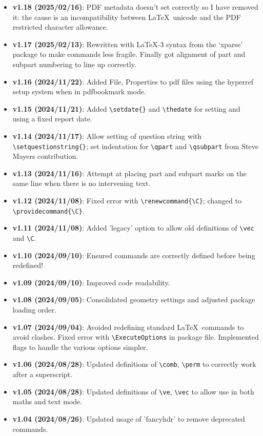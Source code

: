 \documentclass[a4paper,11pt,twoside]{article}
\begin{document}
\begin{itemize}
\item \textbf{v1.18 (2025/02/16)}: PDF metadata doesn't set correctly so I have removed it: the cause is an incompatibility between \LaTeX\ unicode and the PDF restricted character allowance.
\item \textbf{v1.17 (2025/02/13)}: Rewritten with \LaTeX-3 syntax from the `xparse' package to make commands less fragile. Finally got alignment of part and subpart numbering to line up correctly.
\item \textbf{v1.16 (2024/11/22)}: Added File, Properties to pdf files using the hyperref setup system when in pdfbookmark mode.
\item \textbf{v1.15 (2024/11/21)}: Added \verb|\setdate{}| and \verb|\thedate| for setting and using a fixed report date.
\item \textbf{v1.14 (2024/11/17)}: Allow setting of question string with \verb|\setquestionstring{}|; set indentation for \verb|\qpart| and \verb|\qsubpart| from Steve Mayers contribution.
\item \textbf{v1.13 (2024/11/16)}: Attempt at placing part and subpart marks on the same line when there is no intervening text.
\item \textbf{v1.12 (2024/11/08)}: Fixed error with \verb|\renewcommand{\C}|; changed to \\ \verb|\providecommand{\C}|.
\item \textbf{v1.11 (2024/11/08)}: Added 'legacy' option to allow old definitions of \verb|\vec| and \verb|\C|.
\item \textbf{v1.10 (2024/09/10)}: Ensured commands are correctly defined before being redefined!
\item \textbf{v1.09 (2024/09/10)}: Improved code readability.
\item \textbf{v1.08 (2024/09/05)}: Consolidated geometry settings and adjusted package loading order.
\item \textbf{v1.07 (2024/09/04)}: Avoided redefining standard \LaTeX\ commands to avoid clashes. Fixed error with \verb|\ExecuteOptions| in package file. Implemented flags to handle the various options simpler.
\item \textbf{v1.06 (2024/08/28)}: Updated definitions of \verb|\comb|, \verb|\perm| to correctly work after a superscript.
\item \textbf{v1.05 (2024/08/28)}: Updated definitions of \verb|\ve|, \verb|\vec| to allow use in both maths and text mode.
\item \textbf{v1.04 (2024/08/26)}: Updated usage of 'fancyhdr' to remove deprecated commands.
\end{itemize}
\end{document}
